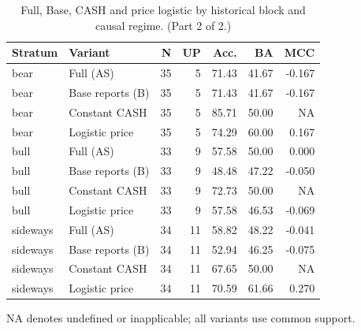 \begin{table}[htbp]
\centering\small
\caption{Full, Base, CASH and price logistic by historical block and causal regime. (Part 2 of 2.)}
\label{tab:r1_common_strata_2}
\setlength{\tabcolsep}{3.5pt}
\begin{tabular}{llrrrrr}
\hline
Stratum & Variant & N & UP & Acc. & BA & MCC \\
\hline
bear & Full (AS) & 35 & 5 & 71.43 & 41.67 & -0.167 \\
bear & Base reports (B) & 35 & 5 & 71.43 & 41.67 & -0.167 \\
bear & Constant CASH & 35 & 5 & 85.71 & 50.00 & NA \\
bear & Logistic price & 35 & 5 & 74.29 & 60.00 & 0.167 \\
bull & Full (AS) & 33 & 9 & 57.58 & 50.00 & 0.000 \\
bull & Base reports (B) & 33 & 9 & 48.48 & 47.22 & -0.050 \\
bull & Constant CASH & 33 & 9 & 72.73 & 50.00 & NA \\
bull & Logistic price & 33 & 9 & 57.58 & 46.53 & -0.069 \\
sideways & Full (AS) & 34 & 11 & 58.82 & 48.22 & -0.041 \\
sideways & Base reports (B) & 34 & 11 & 52.94 & 46.25 & -0.075 \\
sideways & Constant CASH & 34 & 11 & 67.65 & 50.00 & NA \\
sideways & Logistic price & 34 & 11 & 70.59 & 61.66 & 0.270 \\
\hline
\end{tabular}
\par\smallskip\footnotesize NA denotes undefined or inapplicable; all variants use common support.
\end{table}

